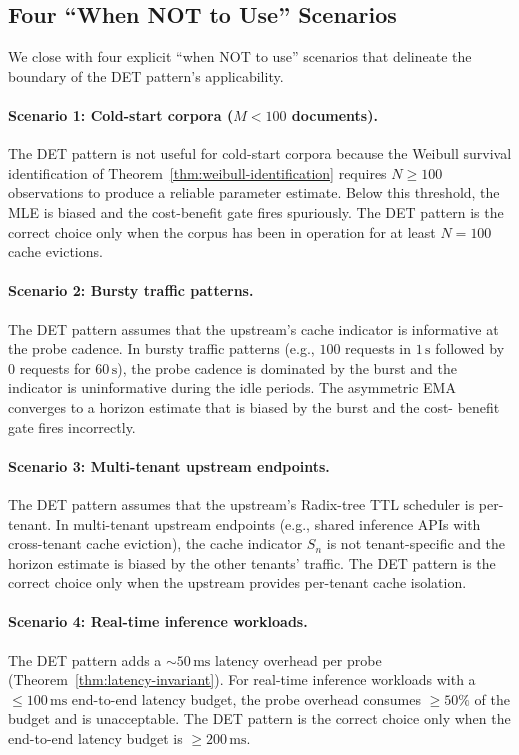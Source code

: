 \subsection{Four ``When NOT to Use'' Scenarios}

We close with four explicit ``when NOT to use'' scenarios that
delineate the boundary of the DET pattern's applicability.

\paragraph{Scenario 1: Cold-start corpora ($M < 100$ documents).}
The DET pattern is not useful for cold-start corpora because the
Weibull survival identification of
Theorem~\ref{thm:weibull-identification} requires $N \ge 100$
observations to produce a reliable parameter estimate. Below this
threshold, the MLE is biased and the cost-benefit gate fires
spuriously. The DET pattern is the correct choice only when the
corpus has been in operation for at least $N = 100$ cache evictions.

\paragraph{Scenario 2: Bursty traffic patterns.}
The DET pattern assumes that the upstream's cache indicator is
informative at the probe cadence. In bursty traffic patterns (e.g.,
$100$ requests in $1\,\text{s}$ followed by $0$ requests for $60\,\text{s}$),
the probe cadence is dominated by the burst and the indicator is
uninformative during the idle periods. The asymmetric EMA converges
to a horizon estimate that is biased by the burst and the cost-
benefit gate fires incorrectly.

\paragraph{Scenario 3: Multi-tenant upstream endpoints.}
The DET pattern assumes that the upstream's Radix-tree TTL scheduler
is per-tenant. In multi-tenant upstream endpoints (e.g., shared
inference APIs with cross-tenant cache eviction), the cache indicator
$S_n$ is not tenant-specific and the horizon estimate is biased by
the other tenants' traffic. The DET pattern is the correct choice
only when the upstream provides per-tenant cache isolation.

\paragraph{Scenario 4: Real-time inference workloads.}
The DET pattern adds a $\sim 50\,\text{ms}$ latency overhead per
probe (Theorem~\ref{thm:latency-invariant}). For real-time inference
workloads with a $\le 100\,\text{ms}$ end-to-end latency budget, the
probe overhead consumes $\ge 50\%$ of the budget and is
unacceptable. The DET pattern is the correct choice only when the
end-to-end latency budget is $\ge 200\,\text{ms}$.

